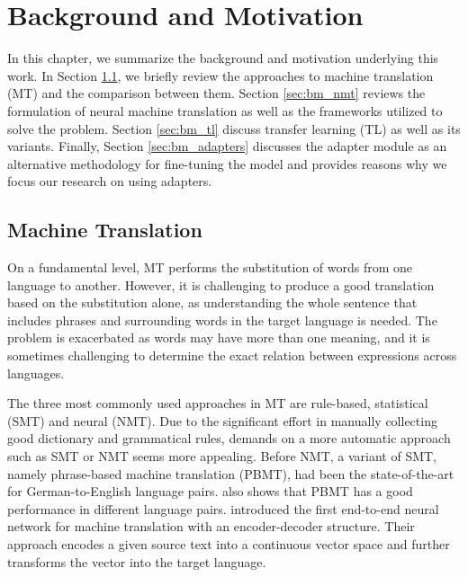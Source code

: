 \chapter{Background and Motivation}

In this chapter, we summarize the background and motivation underlying this work. In Section \ref{sec:bm_smt}, we briefly review the approaches to machine translation (MT) and the comparison between them.
Section \ref{sec:bm_nmt} reviews the formulation of neural machine translation as well as the frameworks utilized to solve the problem.
Section \ref{sec:bm_tl} discuss transfer learning (TL) as well as its variants.
Finally, Section \ref{sec:bm_adapters} discusses the adapter module as an alternative methodology for fine-tuning the model and provides reasons why we focus our research on using adapters.

\section{Machine Translation}
\label{sec:bm_smt}
On a fundamental level, MT performs the substitution of words from one language to another. However, it is challenging to produce a good translation based on the substitution alone, as understanding the whole sentence that includes phrases and surrounding words in the target language is needed. The problem is exacerbated as words may have more than one meaning, and it is sometimes challenging to determine the exact relation between expressions across languages.

The three most commonly used approaches in MT are rule-based, statistical (SMT) and neural (NMT). Due to the significant effort in manually collecting good dictionary and grammatical rules, demands on a more automatic approach such as SMT or NMT seems more appealing.
Before NMT, a variant of SMT, namely phrase-based machine translation (PBMT), had been the state-of-the-art for German-to-English language pairs. \cite{bojar2015proceeding} also shows that PBMT has a good performance in different language pairs. \cite{blunsom2013recurrent} introduced the first end-to-end neural network for machine translation with an encoder-decoder structure. Their approach encodes a given source text into a continuous vector space and further transforms the  vector into the target language.

